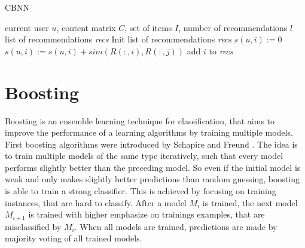 \documentclass[10pt]{reportMaster}
\begin{document}
\begin{algorithm}
	\caption{CBNN}
	\label{alg:CBNN}
	\begin{algorithmic}[1]
		\Require current user $u$, content matrix $C$, set of items $I$, number of recommendations $l$
		\Ensure list of recommendations \textit{recs}
		\State Init list of recommendations \textit{recs}
			\State $s(u,i) := 0$
				\State $s(u,i) := s(u,i) + sim(R(:,i), R(:,j))$
			\EndFor
				\State add $i$ to \textit{recs}
			\EndIf
		\EndFor
	\end{algorithmic}	
\end{algorithm}

 
%
%






\section{Boosting}
\label{sec:boosting}
Boosting is an ensemble learning technique for classification, that aims to improve the performance of a learning algorithms by training multiple models.
First boosting algorithms were introduced by Schapire \cite{boostingSchapire} and Freund \cite{boostingFreund}.
The idea is to train multiple models of the same type iteratively, such that every model performs slightly better than the preceding model.
So even if the initial model is weak and only makes slightly better predictions than random guessing, boosting is able to train a strong classifier.
This is achieved by focusing on training instances, that are hard to classify.
After a model $M_i$ is trained, the next model $M_{i+1}$ is trained with higher emphasize on trainings examples, that are misclassified by $M_i$. 
When all models are trained, predictions are made by majority voting of all trained models.
\end{document}
